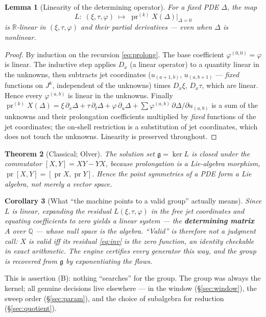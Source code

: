 \documentclass[11pt]{article}
\theoremstyle{plain}
\newtheorem{theorem}{Theorem}[section]
\newtheorem{lemma}[theorem]{Lemma}
\newtheorem{corollary}[theorem]{Corollary}
\theoremstyle{definition}
\theoremstyle{remark}
\newcommand{\g}{\mathfrak{g}}
\newcommand{\R}{\mathbb{R}}
\newcommand{\Q}{\mathbb{Q}}
\newcommand{\pr}{\operatorname{pr}}
\newcommand{\Dx}{D_x}
\begin{document}
\begin{lemma}[Linearity of the determining operator]\label{lem:linear}
For a fixed PDE $\Delta$, the map
\[
L:\;(\xi,\tau,\varphi)\;\longmapsto\;\pr^{(k)}X(\Delta)\big|_{\Delta=0}
\]
is $\R$-linear in $(\xi,\tau,\varphi)$ and their partial derivatives --- even when $\Delta$ is
nonlinear.
\end{lemma}

\begin{proof}
By induction on the recursion \eqref{eq:prolong}. The base coefficient $\varphi^{(0,0)}=\varphi$ is
linear. The inductive step applies $\Dx$ (a linear operator) to a quantity linear in the unknowns,
then subtracts jet coordinates ($u_{(a+1,b)}$, $u_{(a,b+1)}$ --- \emph{fixed} functions on $J^k$,
independent of the unknowns) times $\Dx\xi$, $\Dx\tau$, which are linear. Hence every
$\varphi^{(a,b)}$ is linear in the unknowns. Finally
$\pr^{(k)}X(\Delta)=\xi\,\partial_x\Delta+\tau\,\partial_t\Delta+\varphi\,\partial_u\Delta
+\sum\varphi^{(a,b)}\,\partial\Delta/\partial u_{(a,b)}$
is a sum of the unknowns and their prolongation coefficients multiplied by \emph{fixed} functions of
the jet coordinates; the on-shell restriction is a substitution of jet coordinates, which does not
touch the unknowns. Linearity is preserved throughout.
\end{proof}

\begin{theorem}[Classical; Olver]\label{thm:algebra}
The solution set $\g=\ker L$ is closed under the commutator $[X,Y]=XY-YX$, because prolongation is
a Lie-algebra morphism, $\pr[X,Y]=[\pr X,\pr Y]$. Hence the point symmetries of a PDE form a
\emph{Lie algebra}, not merely a vector space.
\end{theorem}

\begin{corollary}[What ``the machine points to a valid group'' actually means]\label{cor:valid}
Since $L$ is linear, expanding the residual $L(\xi,\tau,\varphi)$ in the free jet coordinates and
equating coefficients to zero yields a linear system --- the \textbf{determining matrix} $A$ over
$\Q$ --- whose null space \emph{is} the algebra. ``Valid'' is therefore not a judgment call:
$X$ is valid iff its residual \eqref{eq:inv} is the zero function, an identity checkable in exact
arithmetic. The engine certifies every generator this way, and the group is recovered from $\g$ by
exponentiating the flows.
\end{corollary}

This is assertion (B): nothing ``searches'' for the group. The group was always the kernel; all
genuine decisions live elsewhere --- in the window (\S\ref{sec:window}), the sweep order
(\S\ref{sec:param}), and the choice of subalgebra for reduction (\S\ref{sec:quotient}).
\end{document}
